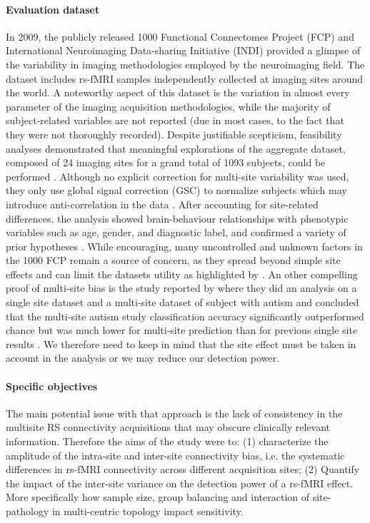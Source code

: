 \documentclass[authoryear]{elsarticle}
\begin{document}
\paragraph{Evaluation dataset} In 2009, the publicly released 1000 Functional Connectomes Project (FCP) and International Neuroimaging Data-sharing Initiative (INDI) provided a glimpse of the variability in imaging methodologies employed by the neuroimaging field. The dataset includes rs-fMRI samples independently collected at imaging sites around the world. A noteworthy aspect of this dataset is the variation in almost every parameter of the imaging acquisition methodologies, while the majority of subject-related variables are not reported (due in most cases, to the fact that they were not thoroughly recorded). 
Despite justifiable scepticism, feasibility analyses demonstrated that meaningful explorations of the aggregate dataset, composed of 24 imaging sites for a grand total of 1093 subjects, could be performed \citep{Biswal2010}. Although no explicit correction for multi-site variability was used, they only use global signal correction (GSC) to normalize subjects which may introduce anti-correlation in the data \citep{Fox2009, Murphy2009, Saad2012, Carbonell2014, Power2014}. After accounting for site-related differences, the analysis showed brain-behaviour relationships with phenotypic variables such as age, gender, and diagnostic label, and confirmed a variety of prior hypotheses \citep{Biswal2010, Fair2012, Tomasi2010, Zuo2012}. While encouraging, many uncontrolled and unknown factors in the 1000 FCP remain a source of concern, as they spread beyond simple site effects and can limit the datasets utility as highlighted by \cite{Yan2013}. An other compelling proof of multi-site bias is the study reported by \cite{Nielsen2013} where they did an analysis on a single site dataset and a multi-site dataset of subject with autism and concluded that the multi-site autism study classification accuracy significantly outperformed chance but was much lower for multi-site prediction than for previous single site results \citep{Nielsen2013}. We therefore need to keep in mind that the site effect must be taken in account in the analysis or we may reduce our detection power.


\paragraph{Specific objectives} 
The main potential issue with that approach is the lack of consistency in the multisite RS connectivity acquisitions that may obscure clinically relevant information. Therefore the aims of the study were to: (1) characterize the amplitude of the intra-site and inter-site connectivity bias, i.e. the systematic differences in rs-fMRI connectivity across different acquisition sites; (2) Quantify the impact of the inter-site variance on the detection power of a rs-fMRI effect. More specifically how sample size, group balancing and interaction of site-pathology in multi-centric topology impact sensitivity.
\end{document}
